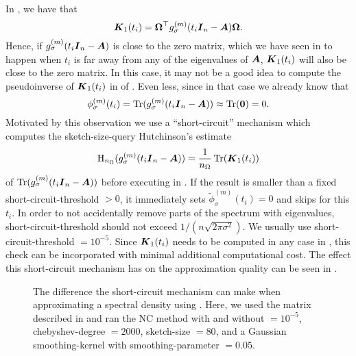 In , we have that
\begin{equation}
    \boldsymbol{K}_1(t_i) = \boldsymbol{\Omega}^{\top} g_{\sigma}^{(m)}(t_i\boldsymbol{I}_n - \boldsymbol{A}) \boldsymbol{\Omega}.
    \label{equ:3-nystrom-interpolated-matrix}
\end{equation}
Hence, if $g_{\sigma}^{(m)}(t_i\boldsymbol{I}_n - \boldsymbol{A})$ is close to the zero matrix,
which we have seen in  to happen when
$t_i$ is far away from any of the eigenvalues of $\boldsymbol{A}$, $\boldsymbol{K}_1(t_i)$ will
also be close to the zero matrix. In this case, it may not be a good idea to
compute the pseudoinverse of $\boldsymbol{K}_1(t_i)$ in 
of . Even less, since in that case we already know that
\begin{equation}
    \phi_{\sigma}^{(m)}(t_i) = \operatorname{Tr}(g_{\sigma}^{(m)}(t_i\boldsymbol{I}_n - \boldsymbol{A})) \approx \operatorname{Tr}(\boldsymbol{0}) = 0.
    \label{equ:3-nystrom-short-circuit}
\end{equation}
Motivated by this observation we use a \enquote{short-circuit} mechanism which 
computes the \gls{sketch-size}-query Hutchinson's estimate 
\begin{equation}
    \operatorname{H}_{n_{\Omega}}(g_{\sigma}^{(m)}(t_i \boldsymbol{I}_n - \boldsymbol{A})) = \frac{1}{n_{\Omega}} \operatorname{Tr}(\boldsymbol{K}_1(t_i))
    \label{equ:3-nystrom-short-circuit-hutchinson}
\end{equation}
of $\operatorname{Tr}(g_{\sigma}^{(m)}(t_i\boldsymbol{I}_n - \boldsymbol{A}))$
before executing  in .
If the result is smaller than a fixed \gls{short-circuit-threshold} $> 0$, it immediately sets
$\widetilde{\phi}_{\sigma}^{(m)}(t_i)=0$ and skips 
for this $t_i$. In order to not accidentally remove parts of the spectrum with eigenvalues,
\gls{short-circuit-threshold} should not exceed $1/(n \sqrt{2\pi \sigma^2})$.
We usually use \gls{short-circuit-threshold} $= 10^{-5}$. Since $\boldsymbol{K}_1(t_i)$
needs to be computed in any case in ,
this check can be incorporated with minimal additional computational cost. The effect this short-circuit
mechanism has on the approximation quality can be seen in .\\

\begin{figure}[ht]
    \centering
    
    \caption{The difference the short-circuit mechanism can make when approximating
        a spectral density using . 
        Here, we used the matrix described in 
        and ran the \gls{NC} method with and without  $= 10^{-5}$,
        \gls{chebyshev-degree} $=2000$, \gls{sketch-size} $=80$, and a
        Gaussian \gls{smoothing-kernel} with \gls{smoothing-parameter} $=0.05$.}
    \label{fig:3-nystrom-short-circuit-mechanism}
\end{figure}

